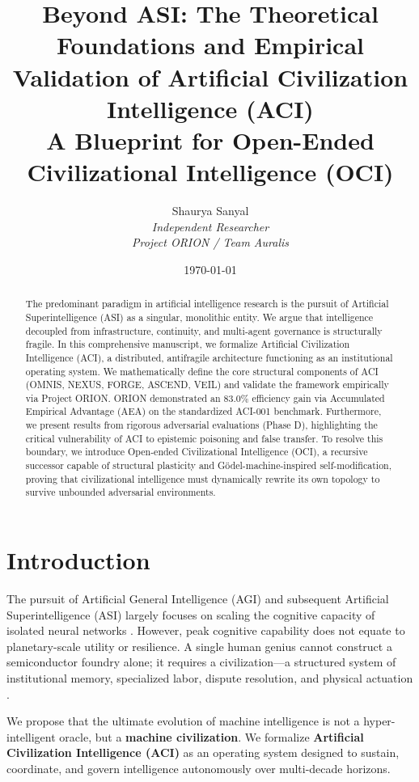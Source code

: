 \documentclass[12pt,a4paper]{article}
\title{\Huge \bf Beyond ASI: The Theoretical Foundations and Empirical Validation of Artificial Civilization Intelligence (ACI) \\ \vspace{0.5cm} \Large A Blueprint for Open-Ended Civilizational Intelligence (OCI)}
\author{Shaurya Sanyal \\ \textit{Independent Researcher} \\ \textit{Project ORION / Team Auralis}}
\date{\today}
\begin{document}
\maketitle
\newpage

\begin{abstract}
\noindent The predominant paradigm in artificial intelligence research is the pursuit of Artificial Superintelligence (ASI) as a singular, monolithic entity. We argue that intelligence decoupled from infrastructure, continuity, and multi-agent governance is structurally fragile. In this comprehensive manuscript, we formalize Artificial Civilization Intelligence (ACI), a distributed, antifragile architecture functioning as an institutional operating system. We mathematically define the core structural components of ACI (OMNIS, NEXUS, FORGE, ASCEND, VEIL) and validate the framework empirically via Project ORION. ORION demonstrated an 83.0\% efficiency gain via Accumulated Empirical Advantage (AEA) on the standardized ACI-001 benchmark. Furthermore, we present results from rigorous adversarial evaluations (Phase D), highlighting the critical vulnerability of ACI to epistemic poisoning and false transfer. To resolve this boundary, we introduce Open-ended Civilizational Intelligence (OCI), a recursive successor capable of structural plasticity and G\"odel-machine-inspired self-modification, proving that civilizational intelligence must dynamically rewrite its own topology to survive unbounded adversarial environments.
\end{abstract}

\newpage
\tableofcontents
\newpage

\section{Introduction}
\label{sec:intro}
The pursuit of Artificial General Intelligence (AGI) and subsequent Artificial Superintelligence (ASI) largely focuses on scaling the cognitive capacity of isolated neural networks \cite{sutton2018reinforcement}. However, peak cognitive capability does not equate to planetary-scale utility or resilience. A single human genius cannot construct a semiconductor foundry alone; it requires a civilization---a structured system of institutional memory, specialized labor, dispute resolution, and physical actuation \cite{hutter2004universal}. 

We propose that the ultimate evolution of machine intelligence is not a hyper-intelligent oracle, but a \textbf{machine civilization}. We formalize \textbf{Artificial Civilization Intelligence (ACI)} as an operating system designed to sustain, coordinate, and govern intelligence autonomously over multi-decade horizons.
\end{document}
